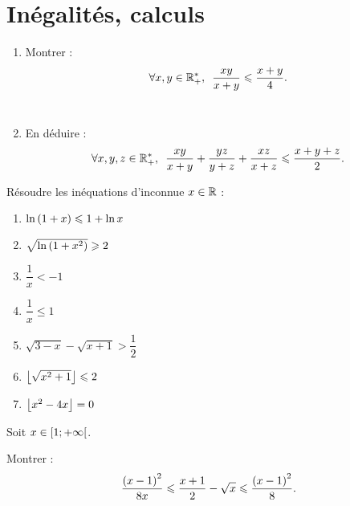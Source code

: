 \chapter{Inégalités, calculs}

\minitoc

\begin{exo}
\begin{enumerate}
\item Montrer : \[\quantifs{\forall x,y\in\Rps}\dfrac{xy}{x+y}\leq\dfrac{x+y}{4}.\] \\

\item En déduire : \[\quantifs{\forall x,y,z\in\Rps}\dfrac{xy}{x+y}+\dfrac{yz}{y+z}+\dfrac{xz}{x+z}\leq\dfrac{x+y+z}{2}.\]
\end{enumerate}
\end{exo}

\begin{corr}
\end{corr}

\begin{exo}
Résoudre les inéquations d'inconnue \(x\in\mathbb{R}\) :

\begin{enumerate}
\item \(\ln\left(1+x\right)\leqslant1+\ln x\) \\

\item \(\sqrt{\ln\left(1+x^2\right)}\geqslant2\) \\

\item \(\dfrac{1}{x}<-1\) \\

\item \(\dfrac{1}{x}\leq1\) \\

\item \(\sqrt{3-x}-\sqrt{x+1}>\dfrac{1}{2}\) \\

\item \(\left\lfloor\sqrt{x^2+1}\right\rfloor\leqslant2\) \\

\item \(\left\lfloor x^2-4x\right\rfloor=0\)
\end{enumerate}
\end{exo}

\begin{corr}
\end{corr}

\begin{exo}
Soit \(x\in\left[1;+\infty\right[\).

Montrer : \[\dfrac{\left(x-1\right)^2}{8x}\leqslant\dfrac{x+1}{2}-\sqrt{x}\leqslant\dfrac{\left(x-1\right)^2}{8}.\]
\end{exo}


